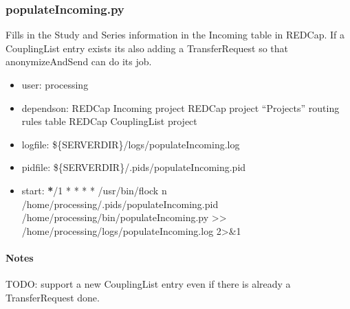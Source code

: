 \documentclass[letterpaper,10pt,english]{sphinxmanual}
\begin{document}
\subsubsection{populateIncoming.py}
\label{\detokenize{Architecture/scripts/populateIncoming:populateincoming-py}}\label{\detokenize{Architecture/scripts/populateIncoming::doc}}
\sphinxAtStartPar
Fills in the Study and Series information in the Incoming table in REDCap. If a CouplingList entry exists its also adding a TransferRequest so that anonymizeAndSend can do its job.
\begin{itemize}
\item {} 
\sphinxAtStartPar
user: processing

\item {} 
\sphinxAtStartPar
depends\sphinxhyphen{}on:
\sphinxhyphen{} REDCap Incoming project
\sphinxhyphen{} REDCap project “Projects” routing rules table
\sphinxhyphen{} REDCap CouplingList project

\item {} 
\sphinxAtStartPar
log\sphinxhyphen{}file:
\sphinxhyphen{} \$\{SERVERDIR\}/logs/populateIncoming.log

\item {} 
\sphinxAtStartPar
pid\sphinxhyphen{}file: \$\{SERVERDIR\}/.pids/populateIncoming.pid

\item {} 
\sphinxAtStartPar
start:
{\color{red}\bfseries{}*}/1 * * * *  /usr/bin/flock \sphinxhyphen{}n /home/processing/.pids/populateIncoming.pid /home/processing/bin/populateIncoming.py \textgreater{}\textgreater{} /home/processing/logs/populateIncoming.log 2\textgreater{}\&1

\end{itemize}


\paragraph{Notes}
\label{\detokenize{Architecture/scripts/populateIncoming:notes}}
\sphinxAtStartPar
TODO: support a new CouplingList entry even if there is already a TransferRequest done.

\sphinxstepscope
\end{document}
